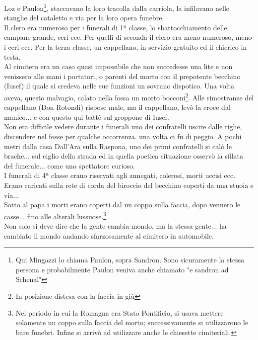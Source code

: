 Loz e Paulon\footnote{Qui Mingazzi lo chiama Paulon, sopra Sandron. Sono sicuramente la stessa persona e probabilmente Paulon veniva anche chiamato "e sandron ad Schenal"}, staccavano la loro tracolla dalla carriola, la infilavano nelle stanghe del cataletto e via per la loro opera funebre.\\
Il clero era numeroso per i funerali di 1ª classe, lo sbattocchiamento delle campane grande, ceri ecc. Per quelli di seconda il clero era meno numeroso, meno i ceri ecc. Per la terza classe, un cappellano, in servizio gratuito ed il chierico in testa.\\
Al cimitero era un caso quasi impossibile che non succedesse una lite e non venissero alle mani i portatori, o parenti del morto con il prepotente becchino (Iusef) il quale si credeva nelle sue funzioni un sovrano dispotico. Una volta aveva, questo malvagio, calato nella fossa un morto bocconi\footnote{In posizione distesa con la faccia in giù}. Alle rimostranze del cappellano (Don Rotondi) rispose male, ma il cappellano, levò la croce dal manico... e con questo qui battè sul groppone di Iusef.\\
Non era difficile vedere durante i funerali uno dei confratelli uscire dalle righe, discendere nel fosse per qualche occorrenza. una volta ci fu di peggio. A pochi metri dalla casa Dall'Ara sulla  Raspona, uno dei primi confratelli si calò le brache... sul ciglio della strada ed in quella poetica situazione osservò la sfilata del funerale... come uno spettatore curioso.\\
I funerali di 4ª classe erano riservati agli annegati, colerosi, morti uccisi ecc. Erano caricati sulla rete di corda del biroccio del becchino coperti da una stuoia e via...\\
Sotto al papa i morti erano coperti dal un coppo sulla faccia, dopo vennero le casse... fino alle alterali lussuose.\footnote{Nel periodo in cui la Romagna era Stato Pontificio, si usava mettere solamente un coppo sulla faccia del morto; successivamente si utilizzarono le bare funebri. Infine si arrivò ad utilizzare anche le chiesette cimiteriali.}\\
Non solo si deve dire che la gente cambia mondo, ma la stessa gente... ha cambiato il mondo andando sfarzosamente al cimitero in automobile. 

